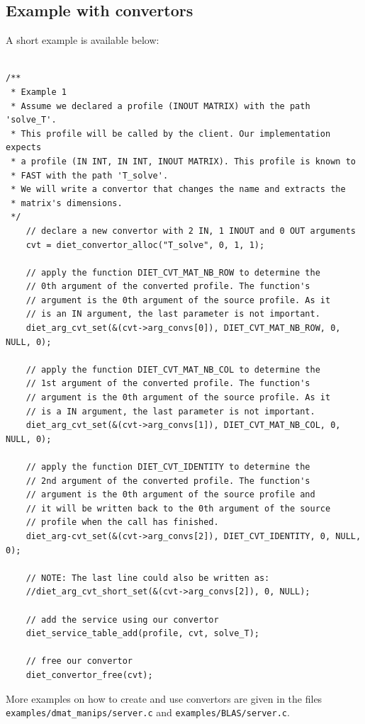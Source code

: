 \subsection{Example with convertors}

\noindent A short example is available below:
\footnotesize
\begin{verbatim}

/**
 * Example 1
 * Assume we declared a profile (INOUT MATRIX) with the path 'solve_T'.
 * This profile will be called by the client. Our implementation expects
 * a profile (IN INT, IN INT, INOUT MATRIX). This profile is known to
 * FAST with the path 'T_solve'.
 * We will write a convertor that changes the name and extracts the
 * matrix's dimensions.
 */
    // declare a new convertor with 2 IN, 1 INOUT and 0 OUT arguments
    cvt = diet_convertor_alloc("T_solve", 0, 1, 1);

    // apply the function DIET_CVT_MAT_NB_ROW to determine the
    // 0th argument of the converted profile. The function's
    // argument is the 0th argument of the source profile. As it
    // is an IN argument, the last parameter is not important.
    diet_arg_cvt_set(&(cvt->arg_convs[0]), DIET_CVT_MAT_NB_ROW, 0, NULL, 0);

    // apply the function DIET_CVT_MAT_NB_COL to determine the
    // 1st argument of the converted profile. The function's
    // argument is the 0th argument of the source profile. As it
    // is a IN argument, the last parameter is not important.
    diet_arg_cvt_set(&(cvt->arg_convs[1]), DIET_CVT_MAT_NB_COL, 0, NULL, 0);

    // apply the function DIET_CVT_IDENTITY to determine the
    // 2nd argument of the converted profile. The function's
    // argument is the 0th argument of the source profile and
    // it will be written back to the 0th argument of the source
    // profile when the call has finished.
    diet_arg-cvt_set(&(cvt->arg_convs[2]), DIET_CVT_IDENTITY, 0, NULL, 0);

    // NOTE: The last line could also be written as:
    //diet_arg_cvt_short_set(&(cvt->arg_convs[2]), 0, NULL);

    // add the service using our convertor
    diet_service_table_add(profile, cvt, solve_T);

    // free our convertor
    diet_convertor_free(cvt);
\end{verbatim}
\normalsize

\noindent More examples on how to create and use convertors are given in the
files\\ \texttt{examples/dmat\_manips/server.c} and
\texttt{examples/BLAS/server.c}.

